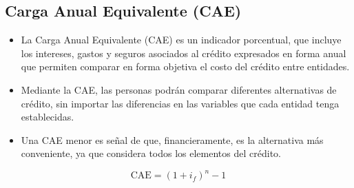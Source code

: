\documentclass{templateNote}
\begin{document}
\subsection*{Carga Anual Equivalente (CAE)}
\begin{itemize}
    \item La Carga Anual Equivalente (CAE) es un indicador porcentual, que incluye los intereses, gastos y seguros asociados al crédito expresados en forma anual que permiten comparar en forma objetiva el costo del crédito entre entidades.
    \item Mediante la CAE, las personas podrán comparar diferentes alternativas de crédito, sin importar las diferencias en las variables que cada entidad tenga establecidas.
    \item Una CAE menor es señal de que, financieramente, es la alternativa más conveniente, ya que considera todos los elementos del crédito.
\end{itemize}
\begin{equation*}
    \text{CAE} = (1+i_f)^n - 1
\end{equation*}
\end{document}

